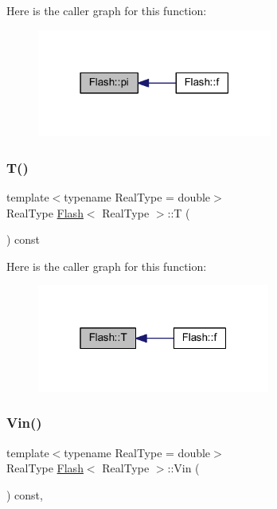 Here is the caller graph for this function\+:\nopagebreak
\begin{figure}[H]
\begin{center}
\leavevmode
\includegraphics[width=219pt]{class_flash_a7a00a2495097cc7d45ee1f61b512829d_icgraph}
\end{center}
\end{figure}
\mbox{\label{class_flash_aacc8bbe06bf30d2e124bbc6eadb31507}} 
\subsubsection{\texorpdfstring{T()}{T()}}
{\footnotesize\ttfamily template$<$typename Real\+Type = double$>$ \\
Real\+Type \mbox{\hyperlink{class_flash}{Flash}}$<$ Real\+Type $>$\+::T (\begin{DoxyParamCaption}{ }\end{DoxyParamCaption}) const\hspace{0.3cm}{\ttfamily [inline]}}

Here is the caller graph for this function\+:\nopagebreak
\begin{figure}[H]
\begin{center}
\leavevmode
\includegraphics[width=217pt]{class_flash_aacc8bbe06bf30d2e124bbc6eadb31507_icgraph}
\end{center}
\end{figure}
\mbox{\label{class_flash_a6b1604cf88d584aeea83f00bc7587dda}} 
\subsubsection{\texorpdfstring{Vin()}{Vin()}}
{\footnotesize\ttfamily template$<$typename Real\+Type = double$>$ \\
Real\+Type \mbox{\hyperlink{class_flash}{Flash}}$<$ Real\+Type $>$\+::Vin (\begin{DoxyParamCaption}{ }\end{DoxyParamCaption}) const\hspace{0.3cm}{\ttfamily [inline]}, {\ttfamily [virtual]}}



